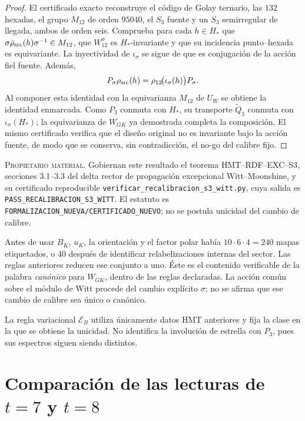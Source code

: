 \begin{proof}
El certificado exacto reconstruye el código de Golay ternario, las \(132\)
hexadas, el grupo \(M_{12}\) de orden \(95040\), el \(S_3\) fuente y un
\(S_3\) semirregular de llegada, ambos de orden seis. Comprueba para cada
\(h\in H_*\) que
\(
\sigma\bar\rho_{\rm src}(h)\sigma^{-1}\in M_{12}
\), que \(W_{12}^{\sigma}\) es \(H_*\)-invariante y que su incidencia
punto--hexada es equivariante. La inyectividad de \(\iota_\sigma\) se sigue
de que es conjugación de la acción fiel fuente. Además,
\[
 P_\sigma\rho_{\rm src}(h)
 =\rho_{12}\!\bigl(\iota_\sigma(h)\bigr)P_\sigma.
\]
Al componer esta identidad con la equivarianza \(M_{12}\) de \(U_W\) se
obtiene la identidad enmarcada. Como \(P_3\) conmuta con \(H_*\), su
transporte \(\widetilde Q_3\) conmuta con \(\iota_\sigma(H_*)\); la
equivarianza de \(W_{GK}\) ya demostrada completa la composición. El mismo
certificado verifica que el diseño original no es invariante bajo la acción
fuente, de modo que se conserva, sin contradicción, el no-go del calibre fijo.
\end{proof}

\textsc{Propietario material.} Gobiernan este resultado el teorema
\textsc{HMT--RDF--EXC--S3}, secciones 3.1--3.3 del delta rector de propagación
excepcional Witt--Moonshine, y su certificado reproducible
\texttt{verificar\_recalibracion\_s3\_witt.py}, cuya salida es
\texttt{PASS\_RECALIBRACION\_S3\_WITT}. El estatuto es
\texttt{FORMALIZACION\_NUEVA/CERTIFICADO\_NUEVO}; no se postula unicidad del
cambio de calibre.

Antes de usar \(B_K\), \(u_K\), la orientación y el factor polar había
\(10\cdot6\cdot4=240\) mapas etiquetados, o \(40\) después de identificar
relabelizaciones internas del sector. Las reglas anteriores reducen ese
conjunto a uno. Éste es el contenido verificable de la palabra
\emph{canónico} para \(W_{GK}\), dentro de las reglas declaradas. La acción
común sobre el módulo de Witt procede del cambio explícito \(\sigma\); no se
afirma que ese cambio de calibre sea único o canónico.

La regla variacional \(\mathcal E_B\) utiliza únicamente datos HMT anteriores
y fija la clase en la que se obtiene la unicidad. No identifica la involución
de estrella con \(P_3\), pues sus espectros siguen siendo distintos.

\section{Comparación de las lecturas de \texorpdfstring{\(t=7\) y \(t=8\)}{t=7 y t=8}}

